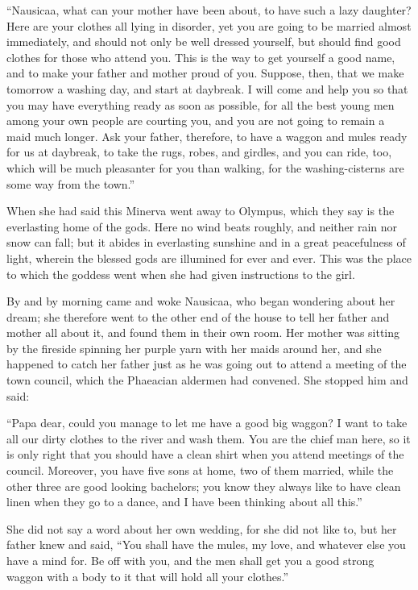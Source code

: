 “Nausicaa, what can your mother have been about, to have such a lazy daughter?
Here are your clothes all lying in disorder, yet you are going to be married
almost immediately, and should not only be well dressed yourself, but should
find good clothes for those who attend you. This is the way to get yourself a
good name, and to make your father and mother proud of you. Suppose, then, that
we make tomorrow a washing day, and start at daybreak. I will come and help you
so that you may have everything ready as soon as possible, for all the best
young men among your own people are courting you, and you are not going to
remain a maid much longer. Ask your father, therefore, to have a waggon and
mules ready for us at daybreak, to take the rugs, robes, and girdles, and you
can ride, too, which will be much pleasanter for you than walking, for the
washing-cisterns are some way from the town.”

When she had said this Minerva went away to Olympus, which they say is the
everlasting home of the gods. Here no wind beats roughly, and neither rain nor
snow can fall; but it abides in everlasting sunshine and in a great
peacefulness of light, wherein the blessed gods are illumined for ever and
ever. This was the place to which the goddess went when she had given
instructions to the girl.

By and by morning came and woke Nausicaa, who began wondering about her dream;
she therefore went to the other end of the house to tell her father and mother
all about it, and found them in their own room. Her mother was sitting by the
fireside spinning her purple yarn with her maids around her, and she happened
to catch her father just as he was going out to attend a meeting of the town
council, which the Phaeacian aldermen had convened. She stopped him and said:

“Papa dear, could you manage to let me have a good big waggon? I want to take
all our dirty clothes to the river and wash them. You are the chief man here,
so it is only right that you should have a clean shirt when you attend meetings
of the council. Moreover, you have five sons at home, two of them married,
while the other three are good looking bachelors; you know they always like to
have clean linen when they go to a dance, and I have been thinking about all
this.”

She did not say a word about her own wedding, for she did not like to, but her
father knew and said, “You shall have the mules, my love, and whatever else you
have a mind for. Be off with you, and the men shall get you a good strong
waggon with a body to it that will hold all your clothes.”

